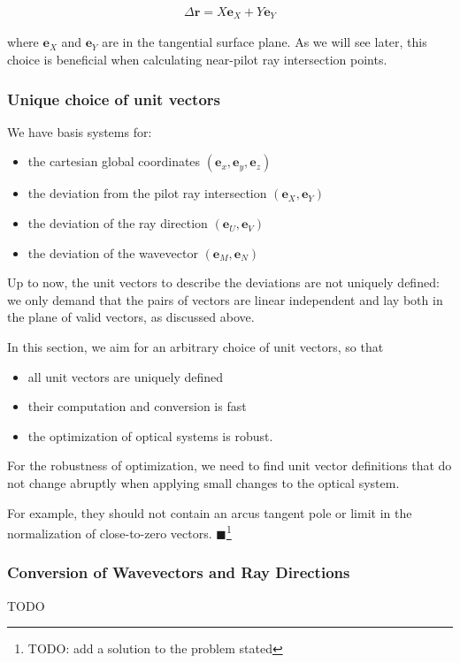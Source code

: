 \documentclass[12pt,a4paper,twoside,openright,BCOR10mm,headsepline,titlepage,abstracton,chapterprefix,final]{scrreprt}
\newcommand\Vector[1]{{\mathbf{#1}}}
\newcommand{\remark}[1]{{\color{red}$\blacksquare$}\footnote{{\color{red}#1}}}
\begin{document}
\begin{eqnarray}
 \Delta\Vector{r} = X \Vector{e}_{X} + Y \Vector{e}_{Y}
 \label{eq:deltaR_equals_XY}
\end{eqnarray}

where $\Vector{e}_{X}$ and $\Vector{e}_{Y}$ are in the tangential surface plane.
As we will see later, this choice is beneficial when calculating near-pilot ray intersection points.


\subsubsection{Unique choice of unit vectors}
We have basis systems for:
\begin{itemize}
 \item the cartesian global coordinates $( \Vector{e}_x, \Vector{e}_y, \Vector{e}_z )$
 \item the deviation from the pilot ray intersection $( \Vector{e}_X, \Vector{e}_Y )$
 \item the deviation of the ray direction $( \Vector{e}_U, \Vector{e}_V )$
 \item the deviation of the wavevector $( \Vector{e}_M, \Vector{e}_N )$
\end{itemize}
Up to now, the unit vectors to describe the deviations are not uniquely defined: 
we only demand that the pairs of vectors are linear independent and lay both in the plane of valid vectors, as discussed above.

In this section, we aim for an arbitrary choice of unit vectors, so that
\begin{itemize}
 \item all unit vectors are uniquely defined
 \item their computation and conversion is fast 
 \item the optimization of optical systems is robust.
\end{itemize}
For the robustness of optimization, 
we need to find unit vector definitions that do not change abruptly 
when applying small changes to the optical system.



For example, they should not contain an arcus tangent pole or limit in the normalization of close-to-zero vectors.
\remark{TODO: add a solution to the problem stated}

\subsubsection{Conversion of Wavevectors and Ray Directions}
TODO
\end{document}
